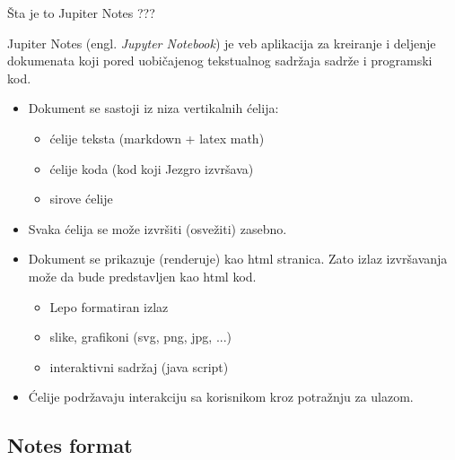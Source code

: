 \documentclass{beamer}
\begin{document}
\begin{frame}{Šta je to Jupiter Notes ???}

  \quad Jupiter Notes (engl. \textit{Jupyter Notebook}) je veb aplikacija za
  kreiranje i deljenje dokumenata koji pored uobičajenog tekstualnog sadržaja
  sadrže i programski kod. 
  \pause



  \begin{itemize}
  \item {
      Dokument se sastoji iz niza vertikalnih ćelija: \pause
      \begin{itemize}
        \item ćelije teksta (markdown + latex math)
        \item ćelije koda  (kod koji Jezgro izvršava)
        \item sirove ćelije
      \end{itemize}
      \pause
  }
  \item {
      Svaka ćelija se može izvršiti (osvežiti) zasebno.
      \pause
  }
  \item {
      Dokument se prikazuje (renderuje) kao html stranica. Zato izlaz izvršavanja može
      da bude predstavljen kao html kod. \pause
      \begin{itemize}
        \item Lepo formatiran izlaz
        \item slike, grafikoni (svg, png, jpg, ...)
        \item interaktivni sadržaj (java script)
      \end{itemize}

      \pause
  }
  \item{
      Ćelije podržavaju interakciju sa korisnikom kroz potražnju za ulazom.
    }
  \end{itemize}
\end{frame}

\subsection{Notes format}
\end{document}
